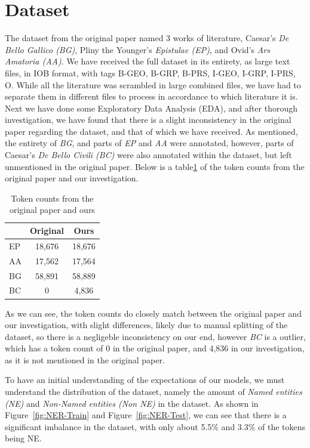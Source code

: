 \documentclass[11pt]{article}
\begin{document}
\section{Dataset}

The dataset from the original paper named 3 works of literature, Caesar's \textit{De Bello Gallico (BG)}, Pliny the Younger's \textit{Epistulae (EP)},
and Ovid's \textit{Ars Amatoria (AA)}. We have received the full dataset in its entirety, as large text files, in IOB format, with tags B-GEO, B-GRP,
B-PRS, I-GEO, I-GRP, I-PRS, O.
While all the literature was scrambled in large combined files, we have had to separate them in different files to process in accordance to which
literature it is. Next we have done some Exploratory Data Analysis (EDA), and after thorough investigation, we have found that there is a slight
inconsistency in the original paper regarding the dataset, and that of which we have received. As mentioned, the entirety of \textit{BG},
and parts of \textit{EP} and \textit{AA} were annotated, however, parts of Caesar's \textit{De Bello Civili (BC)} were also annotated within
the dataset, but left unmentioned in the original paper. Below is a table\ref{tab:token-counts} of the token counts from the original paper
and our investigation.

\begin{table}[H]
  \centering
  \begin{tabular}{|l|c|c|}
  \hline
  \textbf{} & \textbf{Original} & \textbf{Ours} \\
  \hline
  EP   & 18,676 & 18,676 \\
  \hline
  AA   & 17,562 & 17,564 \\
  \hline
  BG   & 58,891 & 58,889 \\
  \hline
  BC   & 0 & 4,836 \\
  \hline
  \end{tabular}
  \caption{Token counts from the original paper and ours}
  \label{tab:token-counts}
\end{table}

As we can see, the token counts do closely match between the original paper and our investigation, with slight differences, likely due to
manual splitting of the dataset, so there is a negligeble inconsistency on our end, however \textit{BC} is a outlier, which
has a token count of 0 in the original paper, and 4,836 in our investigation, as it is not mentioned in the original paper.

To have an initial understanding of the expectations of our models, we must understand the distribution of the dataset, namely the amount of
\textit{Named entities (NE)} and \textit{Non-Named entities (Non NE)} in the dataset. As shown in Figure~\ref{fig:NER-Train} and Figure~\ref{fig:NER-Test}, 
we can see that there is a significant imbalance in the dataset, with only about 5.5\% and 3.3\% of the tokens being NE.
\end{document}
